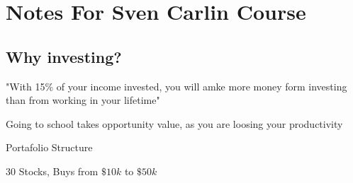 \documentclass[12pt]{article}
\begin{document}
\section{Notes For Sven Carlin Course}%
\label{sec:Notes For Sven Carlin Course}
\subsection{Why investing?}%
\label{sub:Why investing?}
"With 15\% of your income invested, you will amke more money
form investing than from working in your lifetime"

Going to school takes opportunity value, as you are loosing
your productivity

Portafolio Structure

30 Stocks, Buys from $\$10k$ to $\$50k$
\end{document}
